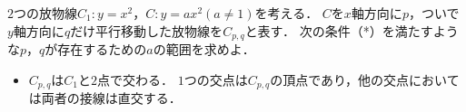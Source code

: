 \documentclass[../../main.tex]{subfiles}
\begin{document}
$2$つの放物線$C_1:y=x^2$，$C:y=ax^2(a\neq 1)$を考える．
$C$を$x$軸方向に$p$，ついで$y$軸方向に$q$だけ平行移動した放物線を$C_{p,q}$と表す．
次の条件（*）を満たすような$p$，$q$が存在するための$a$の範囲を求めよ．
\begin{itemize}
  \item[（*）] $C_{p,q}$は$C_1$と$2$点で交わる．
    $1$つの交点は$C_{p,q}$の頂点であり，他の交点においては両者の接線は直交する．
\end{itemize}
\end{document}
